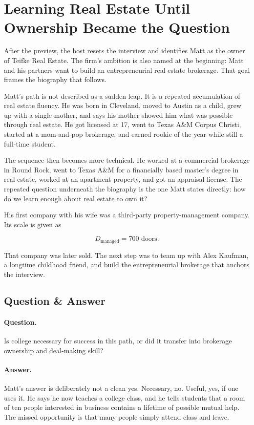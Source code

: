 \section{Learning Real Estate Until Ownership Became the Question}

After the preview, the host resets the interview and identifies Matt as the owner of Teifke Real Estate. The firm's ambition is also named at the beginning: Matt and his partners want to build an entrepreneurial real estate brokerage. That goal frames the biography that follows.

Matt's path is not described as a sudden leap. It is a repeated accumulation of real estate fluency. He was born in Cleveland, moved to Austin as a child, grew up with a single mother, and says his mother showed him what was possible through real estate. He got licensed at 17, went to Texas A\&M Corpus Christi, started at a mom-and-pop brokerage, and earned rookie of the year while still a full-time student.

The sequence then becomes more technical. He worked at a commercial brokerage in Round Rock, went to Texas A\&M for a financially based master's degree in real estate, worked at an apartment property, and got an appraisal license. The repeated question underneath the biography is the one Matt states directly: how do we learn enough about real estate to own it?

His first company with his wife was a third-party property-management company. Its scale is given as

\begin{equation}
D_{\text{managed}}=700\text{ doors}.
\end{equation}

That company was later sold. The next step was to team up with Alex Kaufman, a longtime childhood friend, and build the entrepreneurial brokerage that anchors the interview.

\subsection{Question \& Answer}

\paragraph{Question.}
Is college necessary for success in this path, or did it transfer into brokerage ownership and deal-making skill?

\paragraph{Answer.}
Matt's answer is deliberately not a clean yes. Necessary, no. Useful, yes, if one uses it. He says he now teaches a college class, and he tells students that a room of ten people interested in business contains a lifetime of possible mutual help. The missed opportunity is that many people simply attend class and leave.

